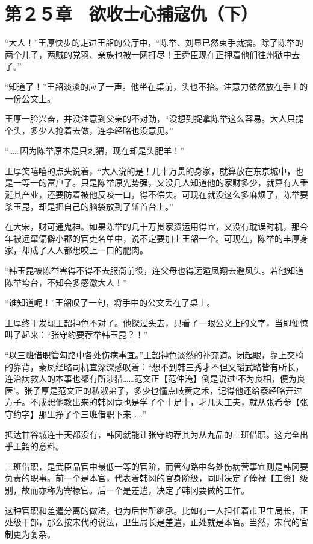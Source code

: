 \section{第２５章　欲收士心捕寇仇（下）}

“大人！”王厚快步的走进王韶的公厅中，“陈举、刘显已然束手就擒。除了陈举的两个儿子，两贼的党羽、亲族也被一网打尽！王舜臣现在正押着他们往州狱中去了。”

“知道了！”王韶淡淡的应了一声。他坐在桌前，头也不抬。注意力依然放在手上的一份公文上。

王厚一脸兴奋，并没注意到父亲的不对劲，“没想到捉拿陈举这么容易。大人只提个头，多少人抢着去做，连李经略也没意见。”

“……因为陈举原本是只刺猬，现在却是头肥羊！”

王厚笑嘻嘻的点头说着，“大人说的是！几十万贯的身家，就算放在东京城中，也是一等一的富户了。只是陈举原先势强，又没几人知道他的家财多少，就算有人垂涎其产业，还要防着被他反咬一口，得不偿失。可现在就没这么多麻烦了，陈举要杀玉昆，却是把自己的脑袋放到了斩首台上。”

在大宋，财可通鬼神。如果陈举的几十万贯家资运用得宜，又没有耽误时机，那今年被远窜偏僻小郡的官吏名单中，说不定要加上王韶一个。可现在，陈举的丰厚身家，却成了人人都想咬上一口的肥肉。

“韩玉昆被陈举害得不得不去服衙前役，连父母也得远遁凤翔去避风头。若他知道陈举垮台，不知会多感激大人！”

“谁知道呢！”王韶叹了一句，将手中的公文丢在了桌上。

王厚终于发现王韶神色不对了。他探过头去，只看了一眼公文上的文字，当即便惊叫了起来：“张守约要荐举韩玉昆？！”

“以三班借职管勾路中各处伤病事宜。”王韶神色淡然的补充道。闭起眼，靠上交椅的靠背，秦凤经略司机宜深深感叹着：“想不到韩三秀才不但文韬武略皆有所长，连治病救人的本事也都有所涉猎……范文正【范仲淹】倒是说过‘不为良相，便为良医’。张子厚是范文正的私淑弟子，多少也懂点岐黄之术，记得他还给蔡经略开过方子。不成想他教出来的韩冈竟也是学了个十足十，才几天工夫，就从张希参【张守约字】那里挣了个三班借职下来……”

抵达甘谷城连十天都没有，韩冈就能让张守约荐其为从九品的三班借职。这完全出乎王韶的意料。

三班借职，是武臣品官中最低一等的官阶，而管勾路中各处伤病营事宜则是韩冈要负责的职事。前一个是本官，代表着韩冈的官身阶级，同时决定了俸禄【工资】级别，故而亦称为寄禄官。后一个是差遣，决定了韩冈要做的工作。

这种官职和差遣分离的做法，也为后世所继承。比如有一人担任着市卫生局长，正处级干部，那么按宋代的说法，卫生局长是差遣，正处就是本官。当然，宋代的官制更为复杂。

